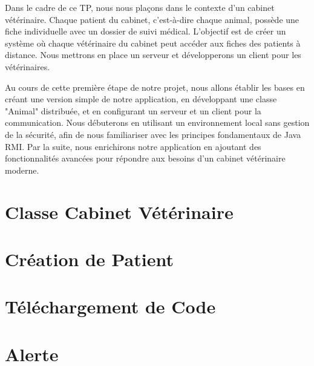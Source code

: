 \documentclass{article} %
\begin{document}
Dans le cadre de ce TP, nous nous plaçons dans le contexte d'un cabinet vétérinaire. 
Chaque patient du cabinet, c'est-à-dire chaque animal, possède une fiche individuelle avec un dossier de suivi médical. 
L'objectif est de créer un système où chaque vétérinaire du cabinet peut accéder aux fiches des patients à distance. 
Nous mettrons en place un serveur et développerons un client pour les vétérinaires. 

Au cours de cette première étape de notre projet, nous allons établir les bases en créant une version simple de notre application, 
en développant une classe "Animal" distribuée, et en configurant un serveur et un client pour la communication. 
Nous débuterons en utilisant un environnement local sans gestion de la sécurité, afin de nous familiariser avec les principes fondamentaux de Java RMI. 
Par la suite, nous enrichirons notre application en ajoutant des fonctionnalités avancées pour répondre aux besoins d'un cabinet vétérinaire moderne.


\newpage %

\section{Classe Cabinet Vétérinaire} %

\newpage %

\section{Création de Patient} %

\newpage %

\section{Téléchargement de Code} %

\newpage %

\section{Alerte} %




\end{document}
